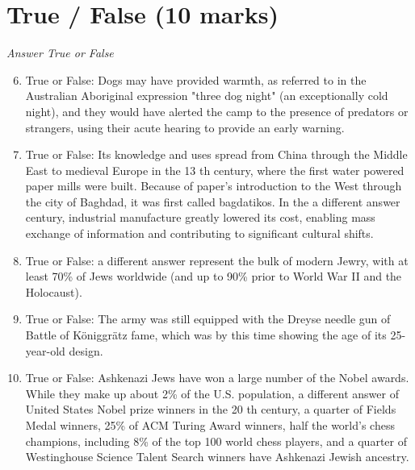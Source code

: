 \documentclass[12pt]{article}
\begin{document}
\section*{True / False (10 marks)}
\textit{Answer True or False}
\begin{enumerate}[label=\arabic*.]
\setcounter{enumi}{5}
\item True or False: Dogs may have provided warmth, as referred to in the Australian Aboriginal expression "three dog night" (an exceptionally cold night), and they would have alerted the camp to the presence of predators or strangers, using their acute hearing to provide an early warning.
\item True or False: Its knowledge and uses spread from China through the Middle East to medieval Europe in the 13 th century, where the first water powered paper mills were built. Because of paper's introduction to the West through the city of Baghdad, it was first called bagdatikos. In the a different answer century, industrial manufacture greatly lowered its cost, enabling mass exchange of information and contributing to significant cultural shifts.
\item True or False: a different answer represent the bulk of modern Jewry, with at least 70\% of Jews worldwide (and up to 90\% prior to World War II and the Holocaust).
\item True or False: The army was still equipped with the Dreyse needle gun of Battle of Königgrätz fame, which was by this time showing the age of its 25-year-old design.
\item True or False: Ashkenazi Jews have won a large number of the Nobel awards. While they make up about 2\% of the U.S. population, a different answer of United States Nobel prize winners in the 20 th century, a quarter of Fields Medal winners, 25\% of ACM Turing Award winners, half the world's chess champions, including 8\% of the top 100 world chess players, and a quarter of Westinghouse Science Talent Search winners have Ashkenazi Jewish ancestry.
\end{enumerate}
\end{document}
